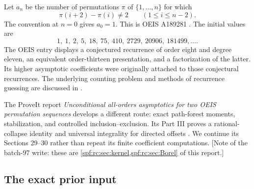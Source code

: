 \documentclass[11pt]{article}
\numberwithin{equation}{section}
\theoremstyle{definition}
\theoremstyle{remark}
\theoremstyle{definition}
\begin{document}
Let $a_n$ be the number of permutations $\pi$ of $\{1,\ldots,n\}$ for which
\begin{equation}
 \pi(i+2)-\pi(i)\ne2\qquad(1\le i\le n-2).
 \label{spf:bc:eq:definition}
\end{equation}
The convention at $n=0$ gives $a_0=1$. This is OEIS A189281
\cite{bcOeis}. The initial values are
\[
 1,\ 1,\ 2,\ 5,\ 18,\ 75,\ 410,\ 2729,\ 20906,\ 181499,\ldots.
\]
The OEIS entry displays a conjectured recurrence of order eight and degree
eleven, an equivalent order-thirteen presentation, and a factorization of the
latter. Its higher asymptotic coefficients were originally attached to those
conjectural recurrences. The underlying counting problem and methods of
recurrence guessing are discussed in \cite{spahn,kauers}.

The ProveIt report \emph{Unconditional all-orders asymptotics for two OEIS
permutation sequences} develops a different route: exact path-forest moments,
stabilization, and controlled inclusion--exclusion. Its Part III proves a
rational-collapse identity and universal integrality for directed offsets
\cite{bcProveIt}. We continue its Sections 29--30 rather than repeat its finite
coefficient computations. [Note of the batch-97 write: these are
\cref{spf:rc:sec:kernel,spf:rc:sec:Borel} of this report.]

\subsection{The exact prior input}
\end{document}
